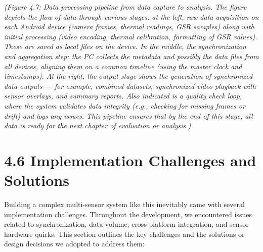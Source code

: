 \documentclass[11pt,a4paper]{report}
\begin{document}
\textit{(Figure 4.7: Data processing pipeline from data capture to analysis.
The figure depicts the flow of data through various stages: at the left,
raw data acquisition on each Android device (camera frames, thermal
readings, GSR samples) along with initial processing (video encoding,
thermal calibration, formatting of GSR values). These are saved as local
files on the device. In the middle, the} \textit{synchronization and
aggregation} \textit{step: the PC collects the metadata and possibly the data
files from all devices, aligning them on a common timeline (using the
master clock and timestamps). At the right, the} \textit{output stage} \textit{shows
the generation of synchronized data outputs --- for example, combined
datasets, synchronized video playback with sensor overlays, and summary
reports. Also indicated is a quality check loop, where the system
validates data integrity (e.g., checking for missing frames or drift)
and logs any issues. This pipeline ensures that by the end of this
stage, all data is ready for the next chapter of evaluation or
analysis.)}

\section{4.6 Implementation Challenges and Solutions}

Building a complex multi-sensor system like this inevitably came with
several implementation challenges. Throughout the development, we
encountered issues related to synchronization, data volume,
cross-platform integration, and sensor hardware quirks. This section
outlines the key challenges and the solutions or design decisions we
adopted to address them:
\end{document}

